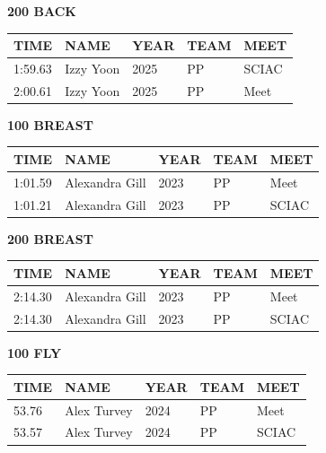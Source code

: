 \begin{table}[H]
\centering
\begin{minipage}[t]{0.48\textwidth}
\centering
\textbf{200 BACK}\\[0.1cm]
\begin{tabular}{@{}p{1.8cm}p{2.8cm}p{1.2cm}p{1.4cm}p{1.4cm}@{}}
\hline
    \textbf{TIME} & \textbf{NAME} & \textbf{YEAR} & \textbf{TEAM} & \textbf{MEET} \\
\hline
    1:59.63 & Izzy Yoon & 2025 & PP & SCIAC \\
    2:00.61 & Izzy Yoon & 2025 & PP & Meet \\
\hline
\end{tabular}
\end{minipage}\hfill
\begin{minipage}[t]{0.48\textwidth}
\centering
\textbf{100 BREAST}\\[0.1cm]
\begin{tabular}{@{}p{1.8cm}p{2.8cm}p{1.2cm}p{1.4cm}p{1.4cm}@{}}
\hline
    \textbf{TIME} & \textbf{NAME} & \textbf{YEAR} & \textbf{TEAM} & \textbf{MEET} \\
\hline
    1:01.59 & Alexandra Gill & 2023 & PP & Meet \\
    1:01.21 & Alexandra Gill & 2023 & PP & SCIAC \\
\hline
\end{tabular}
\end{minipage}
\end{table}

\begin{table}[H]
\centering
\begin{minipage}[t]{0.48\textwidth}
\centering
\textbf{200 BREAST}\\[0.1cm]
\begin{tabular}{@{}p{1.8cm}p{2.8cm}p{1.2cm}p{1.4cm}p{1.4cm}@{}}
\hline
    \textbf{TIME} & \textbf{NAME} & \textbf{YEAR} & \textbf{TEAM} & \textbf{MEET} \\
\hline
    2:14.30 & Alexandra Gill & 2023 & PP & Meet \\
    2:14.30 & Alexandra Gill & 2023 & PP & SCIAC \\
\hline
\end{tabular}
\end{minipage}\hfill
\begin{minipage}[t]{0.48\textwidth}
\centering
\textbf{100 FLY}\\[0.1cm]
\begin{tabular}{@{}p{1.8cm}p{2.8cm}p{1.2cm}p{1.4cm}p{1.4cm}@{}}
\hline
    \textbf{TIME} & \textbf{NAME} & \textbf{YEAR} & \textbf{TEAM} & \textbf{MEET} \\
\hline
    53.76 & Alex Turvey & 2024 & PP & Meet \\
    53.57 & Alex Turvey & 2024 & PP & SCIAC \\
\hline
\end{tabular}
\end{minipage}
\end{table}


